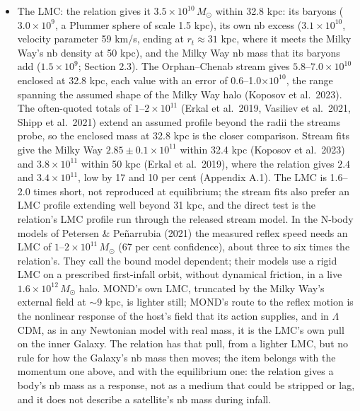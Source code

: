 \documentclass[
  10pt,
]{article}
\begin{document}
\begin{itemize}
\item The LMC: the relation gives it $3.5\times10^{10}\,M_\odot$ within 32.8 kpc: its baryons ($3.0\times10^9$, a Plummer sphere of scale 1.5 kpc), its own nb excess ($3.1\times10^{10}$, velocity parameter 59 km/s, ending at $r_t\approx31$ kpc, where it meets the Milky Way's nb density at 50 kpc), and the Milky Way nb mass that its baryons add ($1.5\times10^9$; Section 2.3). The Orphan--Chenab stream gives $5.8$--$7.0\times10^{10}$ enclosed at 32.8 kpc, each value with an error of 0.6--1.0$\times10^{10}$, the range spanning the assumed shape of the Milky Way halo (Koposov et al.~2023). The often-quoted totals of $1$--$2\times10^{11}$ (Erkal et al.~2019, Vasiliev et al.~2021, Shipp et al.~2021) extend an assumed profile beyond the radii the streams probe, so the enclosed mass at 32.8 kpc is the closer comparison. Stream fits give the Milky Way $2.85\pm0.1\times10^{11}$ within 32.4 kpc (Koposov et al.~2023) and $3.8\times10^{11}$ within 50 kpc (Erkal et al.~2019), where the relation gives $2.4$ and $3.4\times10^{11}$, low by 17 and 10 per cent (Appendix A.1). The LMC is 1.6--2.0 times short, not reproduced at equilibrium; the stream fits also prefer an LMC profile extending well beyond 31 kpc, and the direct test is the relation's LMC profile run through the released stream model. In the N-body models of Petersen \& Pe\~narrubia (2021) the measured reflex speed needs an LMC of $1$--$2\times10^{11}\,M_\odot$ (67 per cent confidence), about three to six times the relation's. They call the bound model dependent; their models use a rigid LMC on a prescribed first-infall orbit, without dynamical friction, in a live $1.6\times10^{12}\,M_\odot$ halo. MOND's own LMC, truncated by the Milky Way's external field at $\sim$9 kpc, is lighter still; MOND's route to the reflex motion is the nonlinear response of the host's field that its action supplies, and in $\Lambda$CDM, as in any Newtonian model with real mass, it is the LMC's own pull on the inner Galaxy. The relation has that pull, from a lighter LMC, but no rule for how the Galaxy's nb mass then moves; the item belongs with the momentum one above, and with the equilibrium one: the relation gives a body's nb mass as a response, not as a medium that could be stripped or lag, and it does not describe a satellite's nb mass during infall.

\end{itemize}
\end{document}
